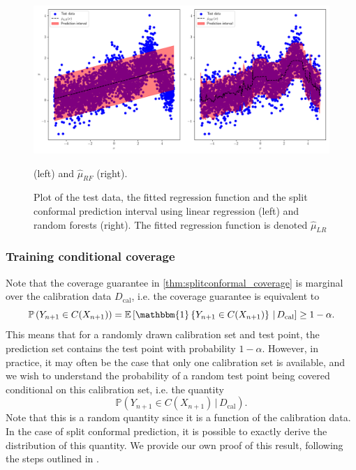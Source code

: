 \documentclass[11pt, titlepage]{article} %
\newcommand{\R}{\mathrm}
\newcommand{\Prob}[1]{\mathbb{P}\left( #1 \right)}
\newcommand{\Exp}[3]{\mathbb{E}\left#2 #1 \right#3}
\newcommand{\Ind}[1]{\mathbbm{1}\left\{ #1 \right\}}
\numberwithin{equation}{section}
\theoremstyle{definition}
\numberwithin{theorem}{section}
\numberwithin{lemma}{section}
\numberwithin{corollary}{section}
\numberwithin{proposition}{section}
\numberwithin{definition}{section}
\numberwithin{remark}{section}
\begin{document}
\begin{figure}[H]
    \centering
    \includegraphics[width=\linewidth]{figures/2_3_LR_RF_example.png}
    \caption{Plot of the test data, the fitted regression function and the split conformal prediction interval using linear regression (left) and random forests (right). The fitted regression function is denoted \(\hat{\mu}_{LR}\)} (left) and \(\hat{\mu}_{RF}\) (right). \label{fig:split_LR_RF}
\end{figure}

\subsubsection{Training conditional coverage}

Note that the coverage guarantee in \cref{thm:splitconformal_coverage} is marginal over the calibration data \(D_\R{cal}\), i.e. the coverage guarantee is equivalent to \[\Prob{Y_{n+1} \in C(X_{n+1})} = \Exp{\Ind{Y_{n+1} \in C(X_{n+1})} \, | \, D_\R{cal}}{[}{]} \geq 1-\alpha. \] This means that for a randomly drawn calibration set and test point, the prediction set contains the test point with probability \(1-\alpha\).  However, in practice, it may often be the case that only one calibration set is available, and we wish to understand the probability of a random test point being covered conditional on this calibration set, i.e. the quantity \[\Prob{Y_{n+1} \in C(X_{n+1}) \, | \, D_\R{cal}}.\] Note that this is a random quantity since it is a function of the calibration data. In the case of split conformal prediction, it is possible to exactly derive the distribution of this quantity. We provide our own proof of this result, following the steps outlined in \cite{tibs_advanced_topics_homework}.
\end{document}
